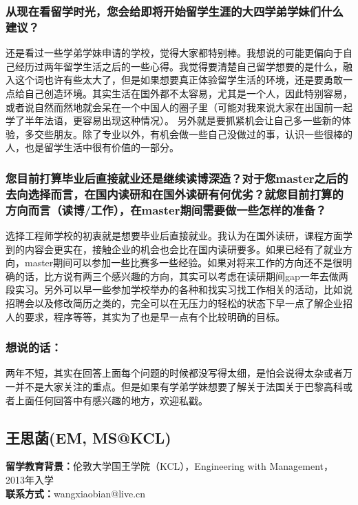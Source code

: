 \documentclass[a4paper,UTF8]{book}
\begin{document}
    \subsubsection*{从现在看留学时光，您会给即将开始留学生涯的大四学弟学妹们什么建议？}
    还是看过一些学弟学妹申请的学校，觉得大家都特别棒。我想说的可能更偏向于自己经历过两年留学生活之后的一些心得。我觉得要清楚自己留学想要的是什么，融入这个词也许有些太大了，但是如果想要真正体验留学生活的环境，还是要勇敢一点给自己创造环境。其实生活在国外都不太容易，尤其是一个人，因此特别容易，或者说自然而然地就会呆在一个中国人的圈子里（可能对我来说大家在出国前一起学了半年法语，更容易出现这种情况）。
    另外就是要抓紧机会让自己多一些新的体验，多交些朋友。除了专业以外，有机会做一些自己没做过的事，认识一些很棒的人，也是留学生活中很有价值的一部分。

    \subsubsection*{您目前打算毕业后直接就业还是继续读博深造？对于您master之后的去向选择而言，在国内读研和在国外读研有何优劣？就您目前打算的方向而言（读博/工作），在master期间需要做一些怎样的准备？}
    选择工程师学校的初衷就是想要毕业后直接就业。我认为在国外读研，课程方面学到的内容会更实在，接触企业的机会也会比在国内读研要多。如果已经有了就业方向，master期间可以参加一些比赛多一些经验。如果对将来工作的方向还不是很明确的话，比方说有两三个感兴趣的方向，其实可以考虑在读研期间gap一年去做两段实习。另外可以早一些参加学校举办的各种和找实习找工作相关的活动，比如说招聘会以及修改简历之类的，完全可以在无压力的轻松的状态下早一点了解企业招人的要求，程序等等，其实为了也是早一点有个比较明确的目标。
        
    \subsubsection{想说的话：}
    两年不短，其实在回答上面每个问题的时候都没写得太细，是怕会说得太杂或者万一并不是大家关注的重点。但是如果有学弟学妹想要了解关于法国关于巴黎高科或者上面任何回答中有感兴趣的地方，欢迎私戳。


\clearpage
\subsection{王思菡(EM, MS@KCL)}
    \textbf{留学教育背景：}伦敦大学国王学院（KCL），Engineering with Management，2013年入学\\
    \textbf{联系方式：}wangxiaobian@live.cn
\end{document}
